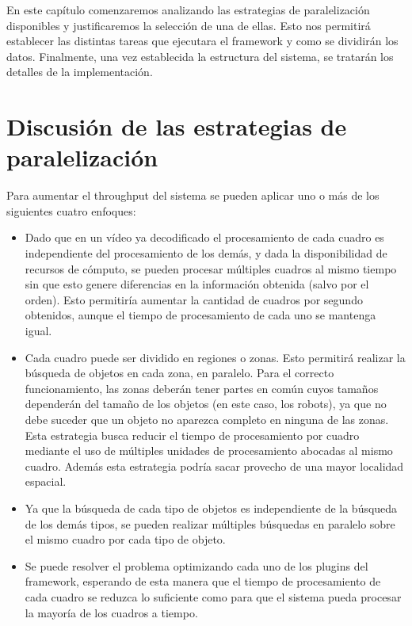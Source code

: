 
En este capítulo comenzaremos analizando las estrategias de paralelización
disponibles y justificaremos la selección de una de ellas. Esto nos permitirá
establecer las distintas tareas que ejecutara el framework y como se dividirán
los datos. Finalmente, una vez establecida la estructura del sistema, se
tratarán los detalles de la implementación.

\label{descripcionSistema}

\section{Discusión de las estrategias de paralelización}

Para aumentar el throughput del sistema se pueden aplicar uno o más de los
siguientes cuatro enfoques:

\begin{itemize}

	\item	Dado que en un vídeo ya decodificado el procesamiento de cada
		cuadro es independiente del procesamiento de los demás, y dada
		la disponibilidad de recursos de cómputo, se pueden procesar
		múltiples cuadros al mismo tiempo sin que esto genere
		diferencias en la información obtenida (salvo por el orden).
		Esto permitiría aumentar la cantidad de cuadros por segundo
		obtenidos, aunque el tiempo de procesamiento de cada uno se
		mantenga igual.

	\item	Cada cuadro puede ser dividido en regiones o zonas. Esto
		permitirá realizar la búsqueda de objetos en cada zona, en
		paralelo.
		Para el correcto funcionamiento, las zonas deberán
		tener partes en común cuyos tamaños dependerán del tamaño de los
		objetos (en este caso, los robots), ya que no debe suceder que
		un objeto no aparezca completo en ninguna de las zonas. Esta
		estrategia busca reducir el tiempo de procesamiento por cuadro
		mediante el uso de múltiples unidades de procesamiento abocadas
		al mismo cuadro. Además esta estrategia podría sacar provecho de
		una mayor localidad espacial.

	\item	Ya que la búsqueda de cada tipo de objetos es independiente de
		la búsqueda de los demás tipos, se pueden realizar múltiples
		búsquedas en paralelo sobre el mismo cuadro por cada tipo de
		objeto.

	\item	Se puede resolver el problema optimizando cada uno de los
		plugins del framework, esperando de esta manera que el tiempo de
		procesamiento de cada cuadro se reduzca lo suficiente como para
		que el sistema pueda procesar la mayoría de los cuadros a
		tiempo.

\end{itemize}

